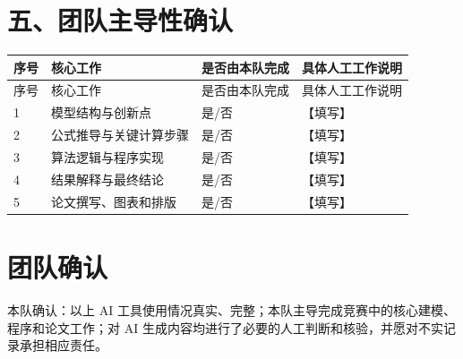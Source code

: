 \documentclass[UTF8,a4paper,11pt]{ctexart}
\begin{document}
\section*{五、团队主导性确认}

\begin{longtable}{p{0.6cm}p{5.0cm}p{1.7cm}p{8.3cm}}
  \toprule
  序号 & 核心工作 & 是否由本队完成 & 具体人工工作说明 \\
  \midrule
  \endfirsthead
  \toprule
  序号 & 核心工作 & 是否由本队完成 & 具体人工工作说明 \\
  \midrule
  \endhead
  1 & 模型结构与创新点 & 是/否 & 【填写】 \\
  2 & 公式推导与关键计算步骤 & 是/否 & 【填写】 \\
  3 & 算法逻辑与程序实现 & 是/否 & 【填写】 \\
  4 & 结果解释与最终结论 & 是/否 & 【填写】 \\
  5 & 论文撰写、图表和排版 & 是/否 & 【填写】 \\
  \bottomrule
\end{longtable}

\section*{团队确认}

\noindent 本队确认：以上 AI 工具使用情况真实、完整；本队主导完成竞赛中的核心建模、程序和论文工作；对 AI 生成内容均进行了必要的人工判断和核验，并愿对不实记录承担相应责任。
\end{document}
